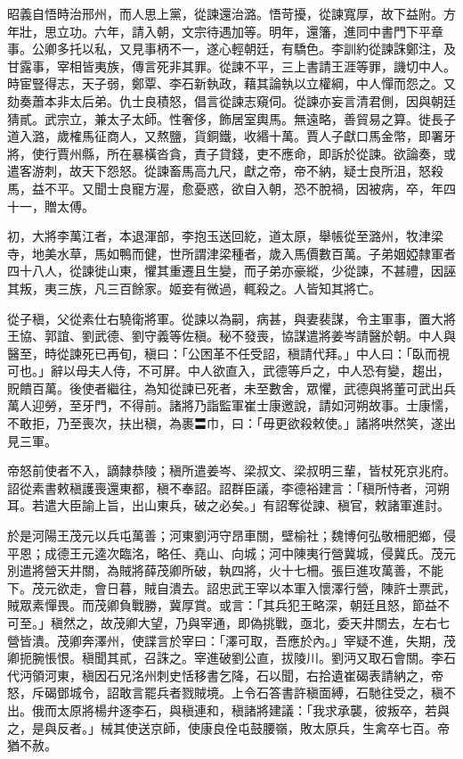 \begin{pinyinscope}
 昭義自悟時治邢州，而人思上黨，從諫還治潞。悟苛擾，從諫寬厚，故下益附。方年壯，思立功。六年，請入朝，文宗待遇加等。明年，還籓，進同中書門下平章事。公卿多托以私，又見事柄不一，遂心輕朝廷，有驕色。李訓約從諫誅鄭注，及甘露事，宰相皆夷族，傳言死非其罪。從諫不平，三上書請王涯等罪，譏切中人。時宦豎得志，天子弱，鄭覃、李石新執政，藉其論執以立權綱，中人憚而怨之。又劾奏蕭本非太后弟。仇士良積怒，倡言從諫志窺伺。從諫亦妄言清君側，因與朝廷猜貳。武宗立，兼太子太師。性奢侈，飾居室輿馬。無遠略，善貿易之算。徙長子道入潞，歲榷馬征商人，又熬鹽，貨銅鐵，收緡十萬。賈人子獻口馬金幣，即署牙將，使行賈州縣，所在暴橫沓貪，責子貸錢，吏不應命，即訴於從諫。欲論奏，或遣客游刺，故天下怨怒。從諫畜馬高九尺，獻之帝，帝不納，疑士良所沮，怒殺馬，益不平。又聞士良寵方渥，愈憂惑，欲自入朝，恐不脫禍，因被病，卒，年四十一，贈太傅。



 初，大將李萬江者，本退渾部，李抱玉送回紇，道太原，舉帳從至潞州，牧津梁寺，地美水草，馬如鴨而健，世所謂津梁種者，歲入馬價數百萬。子弟姻婭隸軍者四十八人，從諫徙山東，懼其重遷且生變，而子弟亦豪縱，少從諫，不甚禮，因誣其叛，夷三族，凡三百餘家。姬妾有微過，輒殺之。人皆知其將亡。



 從子稹，父從素仕右驍衛將軍。從諫以為嗣，病甚，與妻裴謀，令主軍事，置大將王協、郭誼、劉武德、劉守義等佐稹。秘不發喪，協謀遣將姜岑請醫於朝。中人與醫至，時從諫死已再旬，稹曰：「公困革不任受詔，稹請代拜。」中人曰：「臥而視可也。」辭以母夫人侍，不可屏。中人欲直入，武德等戶之，中人恐有變，趨出，貺饋百萬。後使者繼往，為知從諫已死者，未至數舍，眾懼，武德與將董可武出兵萬人迎勞，至牙門，不得前。諸將乃詣監軍崔士康邀說，請如河朔故事。士康懦，不敢拒，乃至喪次，扶出稹，為裹〓巾，曰：「毋更欲殺敕使。」諸將哄然笑，遂出見三軍。



 帝怒前使者不入，謫隸恭陵；稹所遣姜岑、梁叔文、梁叔明三輩，皆杖死京兆府。詔從素書敕稹護喪還東都，稹不奉詔。詔群臣議，李德裕建言：「稹所恃者，河朔耳。若遣大臣諭上旨，出山東兵，破之必矣。」有詔奪從諫、稹官，敕諸軍進討。



 於是河陽王茂元以兵屯萬善；河東劉沔守昂車關，壁榆社；魏博何弘敬柵肥鄉，侵平恩；成德王元逵次臨洺，略任、堯山、向城；河中陳夷行營冀城，侵冀氏。茂元別遣將營天井關，為賊將薛茂卿所破，執四將，火十七柵。張巨進攻萬善，不能下。茂元欲走，會日暮，賊自潰去。詔忠武王宰以本軍入懷澤行營，陳許士票武，賊眾素憚畏。而茂卿負戰勝，冀厚賞。或言：「其兵犯王略深，朝廷且怒，節益不可至。」稹然之，故茂卿大望，乃與宰通，即偽挑戰，亟北，委天井關去，左右七營皆潰。茂卿奔澤州，使諜言於宰曰：「澤可取，吾應於內。」宰疑不進，失期，茂卿扼腕悵恨。稹聞其貳，召誅之。宰進破劉公直，拔陵川。劉沔又取石會關。李石代沔領河東，稹因石兄洺州刺史恬移書乞降，石以聞，右拾遺崔碣表請納之，帝怒，斥碣鄧城令，詔敢言罷兵者戮賊境。上令石答書許稹面縛，石馳往受之，稹不出。俄而太原將楊弁逐李石，與稹連和，稹諸將建議：「我求承襲，彼叛卒，若與之，是與反者。」械其使送京師，使康良佺屯鼓腰嶺，敗太原兵，生禽卒七百。帝猶不赦。




\end{pinyinscope}
